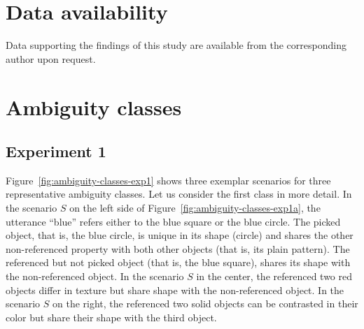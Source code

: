 \documentclass[11pt,a4paper]{article}
\begin{document}
\section*{Data availability}
Data supporting the findings of this study are available from the corresponding author upon request.


\setlength{\bibleftmargin}{.125in}
\setlength{\bibindent}{-\bibleftmargin}



\cleardoublepage

\appendix

\section{Ambiguity classes}

\subsection*{Experiment 1}

Figure~\ref{fig:ambiguity-classes-exp1} shows three exemplar scenarios for three representative ambiguity classes. 
Let us consider the first class in more detail.
In the scenario $S$ on the left side of Figure~\ref{fig:ambiguity-classes-exp1a}, 
the utterance ``blue'' refers either to the blue square or the blue circle.
The picked object, that is, the blue circle, is unique in its shape (circle) and shares the other non-referenced property with both other objects (that is, its plain pattern). 
The referenced but not picked object (that is, the blue square), shares its shape with the non-referenced object. 
In the scenario $S$ in the center, the referenced two red objects differ in texture but share shape with the non-referenced object.
In the scenario $S$ on the right, the referenced two solid objects can be contrasted in their color but share their shape with the third object.
\end{document}
